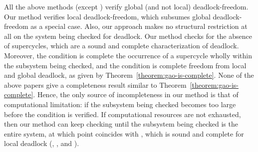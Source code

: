 All the above methods (except ) verify global (and not
local) deadlock-freedom.  Our method verifies local deadlock-freedom, which subsumes 
global deadlock-freedom as a special case.
Also, our approach makes no
structural restriction at all on the system being checked for deadlock.  Our method checks
for the absence of supercycles, which are a sound and complete characterization of
deadlock. 
Moreover, the \LAO condition is complete \wrt the occurrence of a supercycle wholly
within the subsystem being checked, and the \GAO condition is complete
\wrt freedom from local and global deadlock, as given by
Theorem~\ref{theorem:gao-is-complete}.
None of the above papers give a completeness result similar to 
Theorem~\ref{theorem:gao-is-complete}.
%
Hence, the only source of incompleteness in our method is that of computational
limitation: if the subsystem being checked becomes too large before 
the \LAO condition is verified. If computational resources are not exhausted, then our
method can keep checking until the subsystem being checked is the entire system, at which
point \LAO coincides with \GAO, which is sound and complete for local deadlock
(, , and ).


